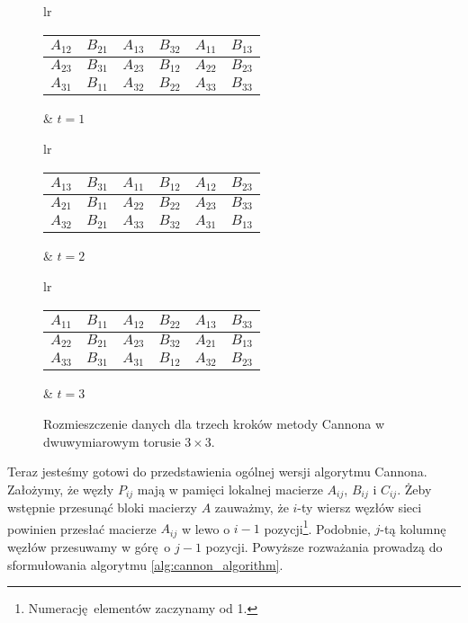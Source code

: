\begin{figure}[H]
\centering
\begin{tabular}{lr}
\begin{tabular}{|cc|cc|cc|}
\hline
\(A_{12}\) & \(B_{21}\) & \(A_{13}\) & \(B_{32}\) & \(A_{11}\) & \(B_{13}\) \\
\hline
\(A_{23}\) & \(B_{31}\) & \(A_{23}\) & \(B_{12}\) & \(A_{22}\) & \(B_{23}\) \\
\hline
\(A_{31}\) & \(B_{11}\) & \(A_{32}\) & \(B_{22}\) & \(A_{33}\) & \(B_{33} \) \\
\hline
\end{tabular} &
\hspace{1cm}\(t=1\)
\end{tabular}
\vspace{0.5cm}

\begin{tabular}{lr}
\begin{tabular}{|cc|cc|cc|}
\hline
\(A_{13}\) & \(B_{31}\) & \(A_{11}\) & \(B_{12}\) & \(A_{12}\) & \(B_{23}\) \\
\hline
\(A_{21}\) & \(B_{11}\) & \(A_{22}\) & \(B_{22}\) & \(A_{23}\) & \(B_{33}\) \\
\hline
\(A_{32}\) & \(B_{21}\) & \(A_{33}\) & \(B_{32}\) & \(A_{31}\) & \(B_{13} \) \\
\hline
\end{tabular} &
\hspace{1cm}\(t=2\)
\end{tabular}
\vspace{0.5cm}

\begin{tabular}{lr}
\begin{tabular}{|cc|cc|cc|}
\hline
\(A_{11}\) & \(B_{11}\) & \(A_{12}\) & \(B_{22}\) & \(A_{13}\) & \(B_{33}\) \\
\hline
\(A_{22}\) & \(B_{21}\) & \(A_{23}\) & \(B_{32}\) & \(A_{21}\) & \(B_{13}\) \\
\hline
\(A_{33}\) & \(B_{31}\) & \(A_{31}\) & \(B_{12}\) & \(A_{32}\) & \(B_{23} \) \\
\hline
\end{tabular} &
\hspace{1cm}\(t=3\)
\end{tabular}
\caption{Rozmieszczenie danych dla trzech kroków metody Cannona w dwuwymiarowym torusie \(3\times 3\).}
\label{fig:cannon_last_one}
\end{figure}

Teraz jesteśmy gotowi do przedstawienia ogólnej wersji algorytmu Cannona. Założymy, że węzły \(P_{ij}\) mają w pamięci lokalnej macierze \(A_{ij}\), \(B_{ij}\) i \(C_{ij}\). Żeby wstępnie przesunąć bloki macierzy \(A\) zauważmy, że \(i\)-ty wiersz węzłów sieci powinien przesłać macierze \(A_{ij}\) w lewo o \(i-1\) pozycji\footnote{Numerację elementów zaczynamy od 1.}. Podobnie, \(j\)-tą kolumnę węzłów przesuwamy w górę o \(j-1\) pozycji. Powyższe rozważania prowadzą do sformułowania algorytmu \ref{alg:cannon_algorithm}.



